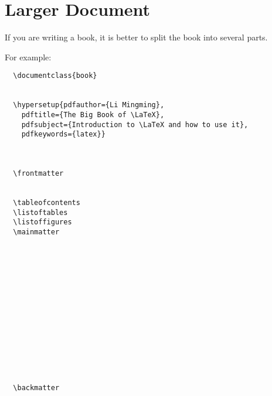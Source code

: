\chapter {Larger Document}

If you are writing a book, it is better to split the book into several parts.

For example:

\begin{verbatim}
  \documentclass{book}
  

  \hypersetup{pdfauthor={Li Mingming},
    pdftitle={The Big Book of \LaTeX},
    pdfsubject={Introduction to \LaTeX and how to use it},
    pdfkeywords={latex}}

  

  \frontmatter
  
  
  \tableofcontents
  \listoftables
  \listoffigures
  \mainmatter
  
  
  
  
  
  
  
  
  
  
  
  
  
  
  
  \backmatter
  
  


  
  
\end{verbatim}





